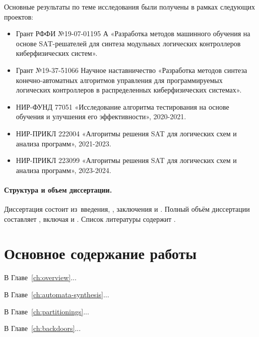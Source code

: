 Основные результаты по теме исследования были получены в рамках следующих проектов:
\begin{itemize}[beginpenalty=10000]
    \item Грант РФФИ №19-07-01195 А «Разработка методов машинного
    обучения на основе SAT-решателей для синтеза модульных логических контроллеров киберфизических систем».
    \item Грант №19-37-51066 Научное наставничество «Разработка методов синтеза конечно-автоматных алгоритмов управления для программируемых логических контроллеров в распределенных киберфизических системах».
    \item НИР-ФУНД 77051 «Исследование алгоритма тестирования на основе обучения и улучшения его эффективности», 2020-2021.
    \item НИР-ПРИКЛ 222004 «Алгоритмы решения SAT для логических схем и анализа программ», 2021-2023.
    \item НИР-ПРИКЛ 223099 «Алгоритмы решения SAT для логических схем и анализа программ», 2023-2024.
\end{itemize}





\paragraph*{Структура и объем диссертации.}
%
Диссертация состоит из~введения,
,
заключения и
.
Полный объём диссертации составляет
, включая
 и
.
Список литературы содержит
.


\section*{Основное содержание работы}

В Главе~\ref{ch:overview}...

В Главе~\ref{ch:automata-synthesis}...

В Главе~\ref{ch:partitionings}...

В Главе~\ref{ch:backdoors}...

